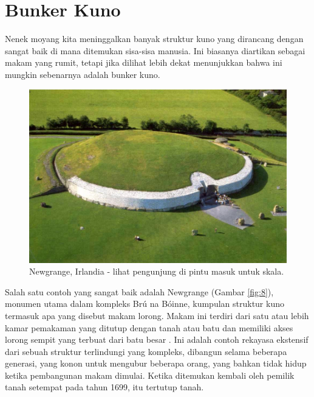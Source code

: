 \documentclass[10pt,twocolumn,letterpaper]{article}
\begin{document}
\section{Bunker Kuno}

Nenek moyang kita meninggalkan banyak struktur kuno yang dirancang dengan sangat baik di mana ditemukan sisa-sisa manusia. Ini biasanya diartikan sebagai makam yang rumit, tetapi jika dilihat lebih dekat menunjukkan bahwa ini mungkin sebenarnya adalah bunker kuno.

\begin{figure}[b]
\begin{center}
   \includegraphics[width=1\linewidth]{ww19.jpg}
\end{center}
   \caption{Newgrange, Irlandia - lihat pengunjung di pintu masuk untuk skala.}
\label{fig:8}
\label{fig:onecol}
\end{figure}

Salah satu contoh yang sangat baik adalah Newgrange (Gambar \ref{fig:8}), monumen utama dalam kompleks Brú na Bóinne, kumpulan struktur kuno termasuk apa yang disebut makam lorong. Makam ini terdiri dari satu atau lebih kamar pemakaman yang ditutup dengan tanah atau batu dan memiliki akses lorong sempit yang terbuat dari batu besar \cite{70}. Ini adalah contoh rekayasa ekstensif dari sebuah struktur terlindungi yang kompleks, dibangun selama beberapa generasi, yang konon untuk mengubur beberapa orang, yang bahkan tidak hidup ketika pembangunan makam dimulai. Ketika ditemukan kembali oleh pemilik tanah setempat pada tahun 1699, itu tertutup tanah.
\end{document}
